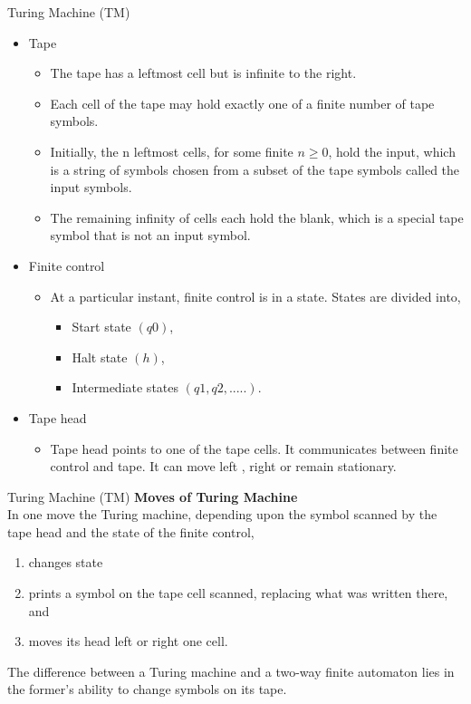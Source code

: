 \documentclass{beamer}
\begin{document}
\begin{frame}{Turing Machine (TM)}

\begin{itemize}
	\item Tape
\begin{itemize}
	\item The tape has a leftmost cell but is infinite to the right.
	\item  Each cell of the tape may hold exactly one 
	of a finite number of tape symbols.
	\item Initially, the n leftmost cells, for some finite $n\geq  0$, hold the input, which is a string of symbols 
	chosen from a subset of the tape symbols called the input symbols.
	\item The remaining infinity of cells each hold the blank, which is a special tape symbol that is not an 
	input symbol.
\end{itemize}
	\item Finite control
\begin{itemize}
	\item 	At a particular instant, finite control is in a state. States are divided into,
	\begin{itemize}
		\item Start state $(q0)$,
		\item Halt state $(h)$,
		\item Intermediate states $(q1, q2, .....)$.
	\end{itemize}
\end{itemize}
	\item Tape head
\begin{itemize}
	\item 	Tape head points to one of the tape cells. It communicates between finite control and tape. It can move left ,
	right or remain stationary.

\end{itemize}
\end{itemize}
\end{frame}
\begin{frame}{Turing Machine (TM)}
	\textbf{Moves of Turing Machine}\\
	In one move the Turing machine, depending upon the symbol scanned by the tape head and the state of 
	the finite control,
	\begin{enumerate}
		\item changes state
		\item prints a symbol on the tape cell scanned, replacing what was written there, and
		\item moves its head left or right one cell.
	\end{enumerate}
The difference between a Turing machine and a two-way finite automaton lies in the former's 
ability to change symbols on its tape.
\end{frame}	
\end{document}
